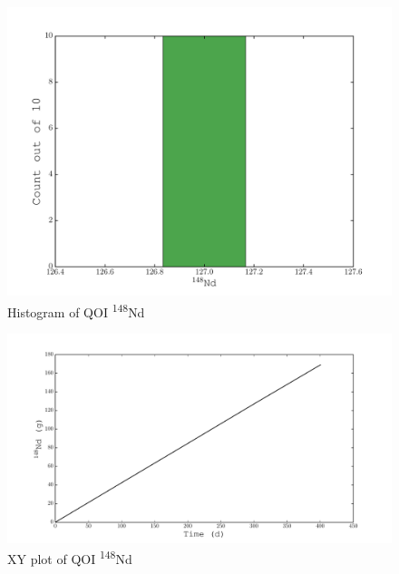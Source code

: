 \documentclass[11pt,notitlepage]{article}
\newcommand{\tss}{\textsuperscript}
\begin{document}
  \begin{figure}[H]
    \begin{center}
      \includegraphics[width=0.77\columnwidth]{../Origen2/PLOTS/ND148Post_HIST.pdf}
      \vspace{-5mm}
      \caption{Histogram of QOI \tss{148}Nd}
      \label{fig:POSTHISTNd148}
    \end{center}
  \end{figure}

    \begin{figure}[H]
    \begin{center}
      \includegraphics[width=0.77\columnwidth]{../Origen2/PLOTS/ND148Post_XY.pdf}
      \vspace{-5mm}
      \caption{XY plot of QOI \tss{148}Nd}
      \label{fig:POSTXYNd148}
    \end{center}
  \end{figure}
\end{document}
